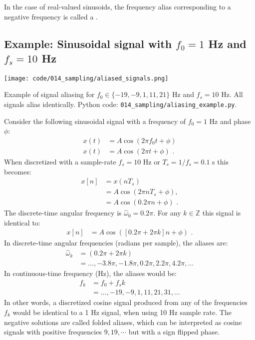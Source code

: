In the case of real-valued sinusoids, the frequency alias
corresponding to a negative frequency is called a \emph{}.

\subsection{Example: Sinusoidal signal with $f_0=1$ Hz and $f_s=10$ Hz}
\begin{marginfigure}
  \begin{center}
    \texttt{[image: code/014\_sampling/aliased\_signals.png]}
  \end{center}
  \caption{Example of signal aliasing for $f_0\in \{-19,-9,1,11,21\}$
    Hz and $f_s=10$ Hz. All signals alias identically. Python code:
    \texttt{014\_sampling/aliasing\_example.py}.}
\end{marginfigure}

Consider the following sinusoidal signal with a frequency of $f_0 =1$ Hz and phase $\phi$:
\begin{align}
  x(t) & =A\cos(2\pi f_0 t + \phi)  \\
  x(t) & =A\cos(2\pi t + \phi)\,\,.
\end{align}
When discretized with a sample-rate $f_s=10$ Hz or $T_s=1/f_s = 0.1$ s this becomes:
\begin{align}
  x[n] & =x(nT_s)                     \\
       & =A\cos(2\pi n T_s + \phi),   \\
       & =A\cos(0.2\pi n + \phi)\,\,.
\end{align}
The discrete-time angular frequency is $\hat{\omega}_0 = 0.2\pi$. 
For any $k\in\mathbb{Z}$ this signal is identical to:
\begin{align}
  x[n] & =A\cos([0.2\pi + 2\pi k] n + \phi)\,\,.
\end{align}
In discrete-time angular frequencies (radians per sample), the aliases are:
\begin{align}
  \hat{\omega}_k & = (0.2\pi+2\pi k)                                   \\
                 & =\ldots,-3.8\pi,-1.8\pi,0.2\pi,2.2\pi,4.2\pi,\ldots
\end{align}
In continuous-time frequency (Hz), the aliases would be:
\begin{align}
  f_k & =f_0 + f_s k                     \\
      & =\ldots,-19,-9,1,11,21,31,\ldots
\end{align}
In other words, a discretized cosine signal produced from any of the frequencies $f_k$ 
would be identical to a 1 Hz signal, when using 10 Hz sample rate. The negative solutions 
are called folded aliases, which can be interpreted as cosine signals with positive 
frequencies $9,19,\cdots$ but with a sign flipped phase.

